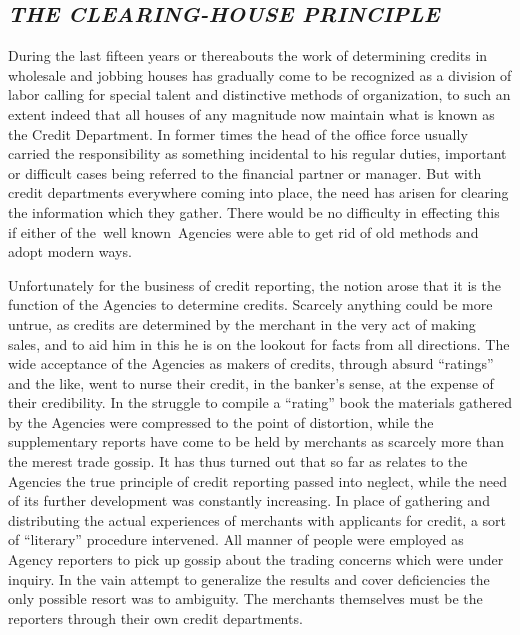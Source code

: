 \documentclass[openany,nobib]{tufte-book}
\begin{document}
\hypertarget{the-clearing-house-principle}{%
\subsection{\texorpdfstring{\emph{THE CLEARING-HOUSE
PRINCIPLE}}{THE CLEARING-HOUSE PRINCIPLE}}\label{the-clearing-house-principle}}

During the last fifteen years or thereabouts the work of determining
credits in wholesale and jobbing houses has gradually come to be
recognized as a division of labor calling for special talent and
distinctive methods of organization, to such an extent indeed that all
houses of any magnitude now maintain what is known as the Credit
Department. In former times the head of the office force usually carried
the responsibility as something incidental to his regular duties,
important or difficult cases being referred to the financial partner or
manager. But with credit departments everywhere coming into place, the
need has arisen for clearing the information which they gather. There
would be no difficulty in effecting this if either of the~well
known~Agencies were able to get rid of old methods and adopt modern
ways.~

Unfortunately for the business of credit reporting, the notion arose
that it is the function of the Agencies to determine credits. Scarcely
anything could be more untrue, as credits are determined by the merchant
in the very act of making sales, and to aid him in this he is on the
lookout for facts from all directions. The wide acceptance of the
Agencies as makers of credits, through absurd ``ratings'' and the like,
went to nurse their credit, in the banker's sense, at the expense of
their credibility. In the struggle to compile a ``rating'' book the
materials gathered by the Agencies were compressed to the point of
distortion, while the supplementary reports have come to be held by
merchants as scarcely more than the merest trade gossip. It has thus
turned out that so far as relates to the Agencies the true principle of
credit reporting passed into neglect, while the need of its further
development was constantly increasing. In place of gathering and
distributing the actual experiences of merchants with applicants for
credit, a sort of ``literary'' procedure intervened. All manner of
people were employed as Agency reporters to pick up gossip about the
trading concerns which were under inquiry. In the vain attempt to
generalize the results and cover deficiencies the only possible resort
was to ambiguity. The merchants themselves must be the reporters through
their own credit departments.~
\end{document}
